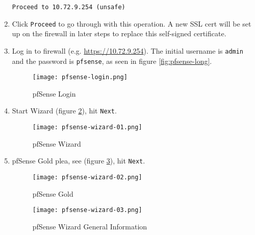 \begin{enumerate}
\begin{verbatim}
Proceed to 10.72.9.254 (unsafe)
\end{verbatim}

 \item Click \texttt{Proceed} to go through with this operation. A new SSL cert will be set up on the firewall in later steps to replace this self-signed certificate.

 \item Log in to firewall (e.g. \url{https://10.72.9.254}). The initial username is \texttt{admin} and the password is \texttt{pfsense}, as seen in figure \ref{fig:pfsense-long}.

\begin{figure}[h!]
\begin{center}
\texttt{[image: pfsense-login.png]}
 \caption{pfSense Login}
 \label{fig:pfsense-login}
\end{center}
\end{figure}

 \item Start Wizard (figure \ref{fig:pfsense-wizard-01}), hit \texttt{Next}.

\begin{figure}[h!]
\begin{center}
\texttt{[image: pfsense-wizard-01.png]}
 \caption{pfSense Wizard}
 \label{fig:pfsense-wizard-01}
\end{center}
\end{figure}

 \item pfSense Gold plea, see (figure \ref{fig:pfsense-wizard-02}), hit \texttt{Next}.

\begin{figure}[h!]
\begin{center}
\texttt{[image: pfsense-wizard-02.png]}
 \caption{pfSense Gold}
 \label{fig:pfsense-wizard-02}
\end{center}
\end{figure}

\begin{figure}[h!]
\begin{center}
\texttt{[image: pfsense-wizard-03.png]}
 \caption{pfSense Wizard General Information}
 \label{fig:pfsense-wizard-03}
\end{center}
\end{figure}


\end{enumerate}
